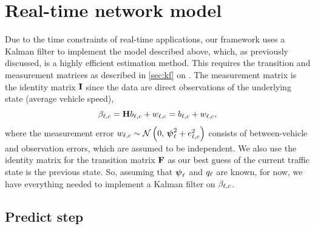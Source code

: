 \section{Real-time network model}
\label{sec:nw_realtime}

Due to the time constraints of real-time applications, our framework uses a Kalman filter to implement the model described above, which, as previously discussed, is a highly efficient estimation method. This requires the transition and measurement matrices as described in \cref{sec:kf} on . The measurement matrix is the identity matrix $\mathbf{I}$ since the data are direct observations of the underlying state (average vehicle speed),
\begin{equation}
\label{eq:kf_meas_identity}
\beta_{\ell,c} = \mathbf{H}b_{\ell,c} + w_{\ell,c} =
b_{\ell,c} + w_{\ell,c},
\end{equation}
where the measurement error $w_{\ell,c} \sim \mathcal{N}\left(0,\, \mathbf{\boldsymbol{\psi}}_{\ell}^2 + e_{\ell,c}^2\right)$ consists of between-vehicle and observation errors, which are assumed to be independent. We also use the identity matrix for the transition matrix $\mathbf{F}$ as our best guess of the current traffic state is the previous state. So, assuming that $\mathbf{\boldsymbol{\psi}}_{\ell}$ and $q_{\ell}$ are known, for now, we have everything needed to implement a Kalman filter on $\beta_{\ell,c}$.


\subsection{Predict step}
\label{sec:kf_predict}

